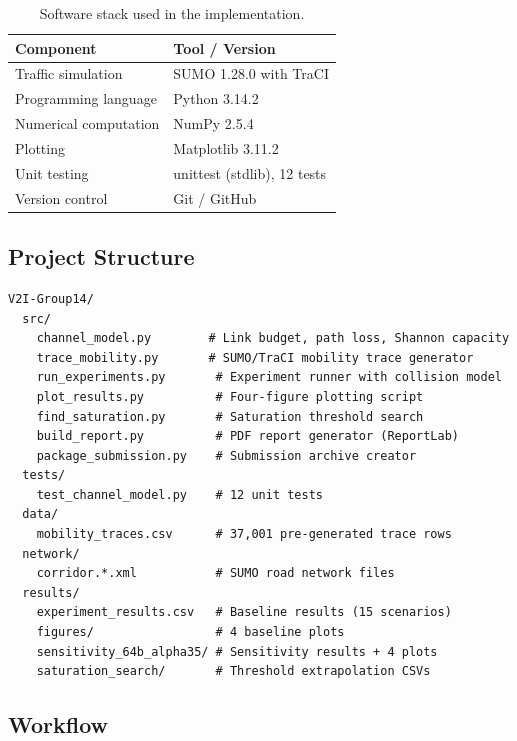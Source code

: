 \documentclass[12pt, a4paper]{article}
\begin{document}
\begin{table}[H]
\centering
\caption{Software stack used in the implementation.}
\label{tab:tools}
\begin{tabular}{ll}
    \toprule
    \textbf{Component}       & \textbf{Tool / Version} \\
    \midrule
    Traffic simulation       & SUMO 1.28.0 with TraCI \\
    Programming language     & Python 3.14.2 \\
    Numerical computation    & NumPy 2.5.4 \\
    Plotting                 & Matplotlib 3.11.2 \\
    Unit testing             & unittest (stdlib), 12 tests \\
    Version control          & Git / GitHub \\
    \bottomrule
\end{tabular}
\end{table}

\subsection{Project Structure}

\begin{lstlisting}[caption={Repository file structure.}]
V2I-Group14/
  src/
    channel_model.py        # Link budget, path loss, Shannon capacity
    trace_mobility.py       # SUMO/TraCI mobility trace generator
    run_experiments.py       # Experiment runner with collision model
    plot_results.py          # Four-figure plotting script
    find_saturation.py       # Saturation threshold search
    build_report.py          # PDF report generator (ReportLab)
    package_submission.py    # Submission archive creator
  tests/
    test_channel_model.py    # 12 unit tests
  data/
    mobility_traces.csv      # 37,001 pre-generated trace rows
  network/
    corridor.*.xml           # SUMO road network files
  results/
    experiment_results.csv   # Baseline results (15 scenarios)
    figures/                 # 4 baseline plots
    sensitivity_64b_alpha35/ # Sensitivity results + 4 plots
    saturation_search/       # Threshold extrapolation CSVs
\end{lstlisting}

\subsection{Workflow}
\end{document}
